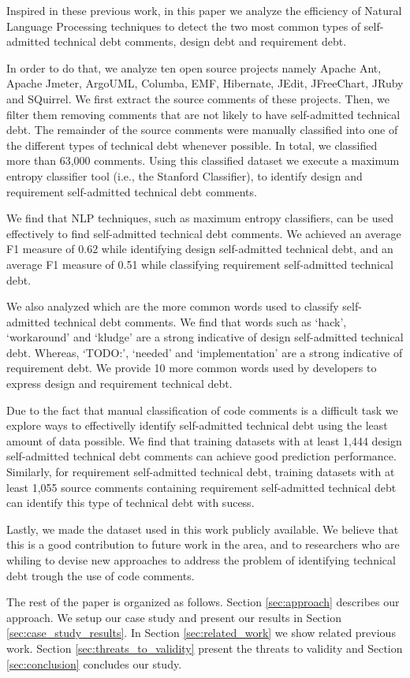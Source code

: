 \documentclass{sig-alternate}
\newcommand{\SATD}{self-admitted technical debt\xspace}
\begin{document}
Inspired in these previous work, in this paper we analyze the efficiency of Natural Language Processing techniques to detect the two most common types of \SATD comments, design debt and requirement debt. 

In order to do that, we analyze ten open source projects namely Apache Ant, Apache Jmeter, ArgoUML, Columba, EMF, Hibernate, JEdit, JFreeChart, JRuby and SQuirrel. We first extract the source comments of these projects. Then, we filter them removing comments that are not likely to have \SATD. The remainder of the source comments were manually classified into one of the different types of technical debt whenever possible. In total, we classified more than 63,000 comments. Using this classified dataset we execute a maximum entropy classifier tool (i.e., the Stanford Classifier), to identify design and requirement \SATD comments.

We find that NLP techniques, such as maximum entropy classifiers, can be used effectively to find \SATD comments. We achieved an average F1 measure of 0.62 while identifying design \SATD, and an average F1 measure of 0.51 while classifying requirement \SATD. 

We also analyzed which are the more common words used to classify \SATD comments. We find that words such as `hack', `workaround' and `kludge' are a strong indicative of design \SATD. Whereas, `TODO:', `needed' and `implementation' are a strong indicative of requirement debt. We provide 10 more common words used by developers to express design and requirement technical debt.  

Due to the fact that manual classification of code comments is a difficult task we explore ways to effectivelly identify \SATD using the least amount of data possible. We find that training datasets with at least 1,444 design \SATD comments can achieve good prediction performance. Similarly, for requirement \SATD, training datasets with at least 1,055 source comments containing requirement \SATD can identify this type of technical debt with sucess.  

Lastly, we made the dataset used in this work publicly available. We believe that this is a good contribution to future work in the area, and to researchers who are whiling to devise new approaches to address the problem of identifying technical debt trough the use of code comments.

The rest of the paper is organized as follows. Section \ref{sec:approach} describes our approach. We setup our case study and present our
results in Section \ref{sec:case_study_results}. In Section \ref{sec:related_work} we show related previous work. Section \ref{sec:threats_to_validity} present the threats to validity and Section \ref{sec:conclusion} concludes our study.  
\end{document}
